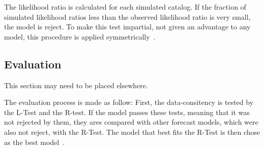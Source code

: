 The likelihood ratio is calculated for each simulated catalog. If the
fraction of simulated likelihood ratios less than the observed
likelihood ratio is very small, the model is reject.  To make this
test impartial, not given an advantage to any model, this procedure is
applied symmetrically~\cite{schorlemmer2010first}.\\


\subsection{Evaluation}\label{eval}
This section may need to be placed elsewhere.

The evaluation process is made as follow: First, the data-consitency
is tested by the L-Test and the R-test. If the model passes these
tests, meaning that it was not rejected by them, they ares compared
with other forecast models, which were also not reject, with the
R-Test. The model that best fits the R-Test is then chose as the best
model~\cite{schorlemmer2007earthquake}.\\

